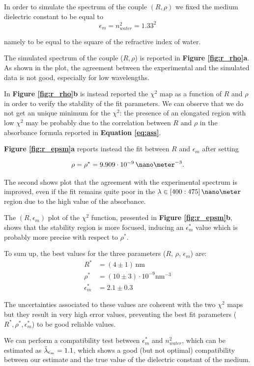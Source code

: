 \documentclass[twocolumn]{article}
\begin{document}
\begin{multicols}{2}
In order to simulate the spectrum of the couple $(R,\rho)$ we fixed the medium dielectric constant to be equal to 
\[\epsilon_m=n_{water}^2=1.33^2\]

\noindent
namely to be equal to the square of the refractive index of water.

The simulated spectrum of the couple ($R,\rho$) is reported in \textbf{Figure \ref{fig:r_rho}a}. As shown in the plot, the agreement between the experimental and the simulated data is not good, especially for low wavelengths.

In \textbf{Figure \ref{fig:r_rho}b} is instead reported the $\chi^2$ map as a function of $R$ and $\rho$ in order to verify the stability of the fit parameters. We can observe that we do not get an unique minimum for the $\chi^2$: the presence of an elongated region with low $\chi^2$ may be probably due to the correlation between $R$ and $\rho$ in the absorbance formula reported in \textbf{Equation \ref{eq:ass}}.

\textbf{Figure \ref{fig:r_epsm}a} reports instead the fit between $R$ and $\epsilon_m$ after setting 

\[\rho = \rho^*=9.909\cdot10^{-9}\,\nano\meter^{-3}.\]

\noindent
The second shows plot that the agreement with the experimental spectrum is improved, even if the fit remains quite poor in the $\lambda \in [400:475]\, \nano\meter$ region due to the high value of the absorbance.

The \( (R,\epsilon_m) \) plot of the $\chi^2$ function, presented in \textbf{Figure \ref{fig:r_epsm}b}, shows that the stability region is more focused, inducing an $\epsilon_m^*$ value which is probably more precise with respect to $\rho^*$.

\noindent
To sum up, the best values for the three parameters ($R$, $\rho$, $\epsilon_m$) are:
\begin{align*}
    R^* &= (4\pm 1)\, \text{nm}\\
    \rho^* &= (10 \pm 3)\cdot 10^{-9} \text{nm}^{-3} \\
    \epsilon_m^* &= 2.1 \pm 0.3
\end{align*}

\noindent
The uncertainties associated to these values are coherent with the two $\chi^2$ maps but they result in very high error values, preventing the best fit parameters ($R^*, \rho^*, \epsilon_m^*$) to be good reliable values. 

We can perform a compatibility test between $\epsilon_m^*$ and $n_{water}^2$, which can be estimated as $\Tilde{\lambda}_{\epsilon_m}=1.1$, which shows a good (but not optimal) compatibility between our estimate and the true value of the dielectric constant of the medium.


\end{multicols}
\end{document}
